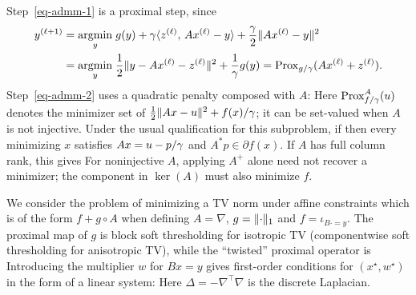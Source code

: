 Step~\eqref{eq-admm-1} is a proximal step, since
\begin{align*}
	y^{(\ell+1)} &= \underset{y}{\operatorname{argmin}}\; 
	g(y) + \gamma \langle z^{(\ell)},\,Ax^{(\ell)}-y\rangle + \frac{\gamma}{2}\lVert Ax^{(\ell)}-y\rVert^2
	\\
	&=\underset{y}{\operatorname{argmin}}\; \frac{1}{2}\lVert y - Ax^{(\ell)} - z^{(\ell)}\rVert^2 + \frac{1}{\gamma} g(y)
	= \operatorname{Prox}_{g/\gamma}( Ax^{(\ell)} + z^{(\ell)} ).
\end{align*}
Step~\eqref{eq-admm-2} uses a quadratic penalty composed with $A$:
Here $\operatorname{Prox}^A_{f/\gamma}(u)$ denotes the minimizer set of $\frac12\lVert Ax-u\rVert^2+f(x)/\gamma$; it can be set-valued when $A$ is not injective. Under the usual qualification for this subproblem, if
then every minimizing $x$ satisfies $Ax=u-p/\gamma$ and $A^*p\in\partial f(x)$. If $A$ has full column rank, this gives
For noninjective $A$, applying $A^+$ alone need not recover a minimizer; the component in $\ker(A)$ must also minimize $f$.

\begin{exmp}
	We consider the problem of minimizing a TV norm under affine constraints
	which is of the form $f + g \circ A$ when defining $A=\nabla$, $g=\lVert\cdot\rVert_1$ and $f=\iota_{B \cdot = y}$. 
	The proximal map of $g$ is block soft thresholding for isotropic TV (componentwise soft thresholding for anisotropic TV), while the ``twisted'' proximal operator is
	Introducing the multiplier $w$ for $Bx=y$ gives first-order conditions for $(x^\star,w^\star)$ in the form of a linear system:
	Here $\Delta=-\nabla^\top \nabla$ is the discrete Laplacian.
\end{exmp}

